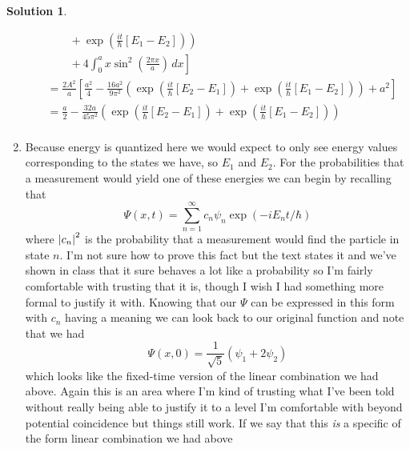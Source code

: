 \documentclass[10pt]{article}
\theoremstyle{definition}
\newtheorem{soln}{Solution}
\begin{document}
\begin{soln}
\begin{enumerate}[label=(\alph*)]
\begin{align*}
             & \qquad+\left.\exp(\frac{it}{\hbar}\left[E_1-E_2\right])\right)                                                                                                    \\
             & \qquad+\left.4\int_{0}^{a}x\sin^2\left(\frac{2\pi x}{a}\right)\,dx\right]                                                                                         \\
             & =\frac{2A^2}{a}\left[\frac{a^2}{4}
              -\frac{16a^2}{9\pi^2}\left(\exp(\frac{it}{\hbar}\left[E_2-E_1\right])
              +\exp(\frac{it}{\hbar}\left[E_1-E_2\right])\right)
            +a^2\right]                                                                                                                                                          \\
             & =\frac{a}{2}-\frac{32a}{45\pi^2}\left(\exp(\frac{it}{\hbar}\left[E_2-E_1\right])
            +\exp(\frac{it}{\hbar}\left[E_1-E_2\right])\right)                                                                                                                   \\
          \end{align*}
          \newpage
    \item Because energy is quantized here we would expect to only see energy values corresponding to the states we have, so $E_1$ and $E_2$.
          For the probabilities that a measurement would yield one of these energies we can begin by
          recalling that
          $$\Psi(x,t)=\sum_{n=1}^{\infty}c_n\psi_n\exp(-iE_nt/\hbar)$$
          where $\abs{c_n}^2$ is the probability that a measurement would find the particle in state
          $n$. I'm not sure how to prove this fact but the text states it and we've shown in class
          that it sure behaves a lot like a probability so I'm fairly comfortable with trusting that it is,
          though I wish I had something more formal to justify it with.
          Knowing that our $\Psi$ can be expressed in this form with $c_n$ having a meaning
          we can look back to our original function and note that we had
          $$\Psi(x,0)=\frac{1}{\sqrt{5}}\left(\psi_1+2\psi_2\right)$$
          which looks like the fixed-time version of the linear combination we had above.
          Again this is an area where I'm kind of trusting what I've been told without really
          being able to justify it to a level I'm comfortable with beyond potential coincidence
          but things still work. If we say that this \emph{is} a specific of the form linear combination we had above

\end{enumerate}
\end{soln}
\end{document}
